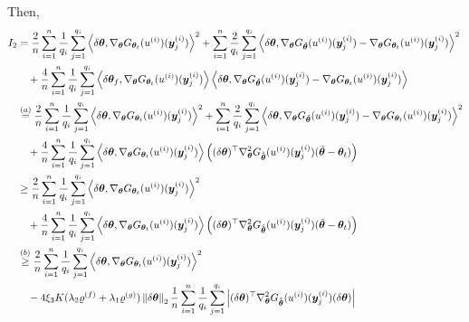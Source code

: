 %
%
Then, 
\begin{equation}
\label{eq:I3-1}
\begin{aligned}
    I_2 & = \frac{2}{n} \sum_{i=1}^n \frac{1}{q_i} \sum_{j=1}^{q_i}  \left\langle \delta \vtheta , \nabla_{\vtheta} G_{\vtheta_t}(u^{(i)})(\vy^{(i)}_j) \right\rangle^2 + \sum_{i=1}^n \frac{2}{q_i} \sum_{j=1}^{q_i}  \left\langle \delta \vtheta , \nabla_{\vtheta} G_{\tilde{\vtheta}}(u^{(i)})(\vy^{(i)}_j) - \nabla_{\vtheta} G_{\vtheta_t}(u^{(i)})(\vy^{(i)}_j) \right\rangle^2 \\
    & \quad + \frac{4}{n} \sum_{i=1}^n \frac{1}{q_i} \sum_{j=1}^{q_i} \left\langle \delta \vtheta_f , \nabla_{\vtheta} G_{\vtheta_t}(u^{(i)})(\vy^{(i)}_j) \right\rangle \left\langle \delta \vtheta , \nabla_{\vtheta} G_{\tilde{\vtheta}}(u^{(i)})(\vy^{(i)}_j) - \nabla_{\vtheta} G_{\vtheta_t}(u^{(i)})(\vy^{(i)}_j) \right\rangle \\
    & \overset{(a)}{=}\frac{2}{n} \sum_{i=1}^n \frac{1}{q_i} \sum_{j=1}^{q_i}  \left\langle \delta \vtheta , \nabla_{\vtheta} G_{\vtheta_t}(u^{(i)})(\vy^{(i)}_j) \right\rangle^2 + \sum_{i=1}^n \frac{2}{q_i} \sum_{j=1}^{q_i}  \left\langle \delta \vtheta , \nabla_{\vtheta} G_{\tilde{\vtheta}}(u^{(i)})(\vy^{(i)}_j) - \nabla_{\vtheta} G_{\vtheta_t}(u^{(i)})(\vy^{(i)}_j) \right\rangle^2 \\
    & \quad + \frac{4}{n} \sum_{i=1}^n \frac{1}{q_i} \sum_{j=1}^{q_i} \left\langle \delta \vtheta , \nabla_{\vtheta} G_{\vtheta_t}(u^{(i)})(\vy^{(i)}_j) \right\rangle \left((\delta \vtheta)^\top \nabla_{\vtheta}^2 G_{\tilde{\tilde{\vtheta}}}(u^{(i)})(\vy^{(i)}_j)(\tilde{\vtheta}-\vtheta_t)\right)
    \\
    & \geq\frac{2}{n} \sum_{i=1}^n \frac{1}{q_i} \sum_{j=1}^{q_i}  \left\langle \delta \vtheta , \nabla_{\vtheta} G_{\vtheta_t}(u^{(i)})(\vy^{(i)}_j) \right\rangle^2  \\
    & \quad + \frac{4}{n} \sum_{i=1}^n \frac{1}{q_i} \sum_{j=1}^{q_i} \left\langle \delta \vtheta , \nabla_{\vtheta} G_{\vtheta_t}(u^{(i)})(\vy^{(i)}_j) \right\rangle \left((\delta \vtheta)^\top \nabla_{\vtheta}^2 G_{\tilde{\tilde{\vtheta}}}(u^{(i)})(\vy^{(i)}_j)(\tilde{\vtheta}-\vtheta_t)\right)
    \\
%     
    & \overset{(b)}{\geq}\frac{2}{n} \sum_{i=1}^n \frac{1}{q_i} \sum_{j=1}^{q_i}  \left\langle \delta \vtheta , \nabla_{\vtheta} G_{\vtheta_t}(u^{(i)})(\vy^{(i)}_j) \right\rangle^2  \\
    & \quad - 
4\xi_3K(\lambda_2\varrho^{(f)}+\lambda_1\varrho^{(g)})\left\|\delta\vtheta\right\|_2
    \frac{1}{n} \sum_{i=1}^n \frac{1}{q_i} \sum_{j=1}^{q_i}
    \left|(\delta \vtheta)^\top \nabla_{\vtheta}^2 G_{\tilde{\tilde{\vtheta}}}(u^{(i)})(\vy^{(i)}_j)(\delta\vtheta)\right|
\end{aligned}
\end{equation}
